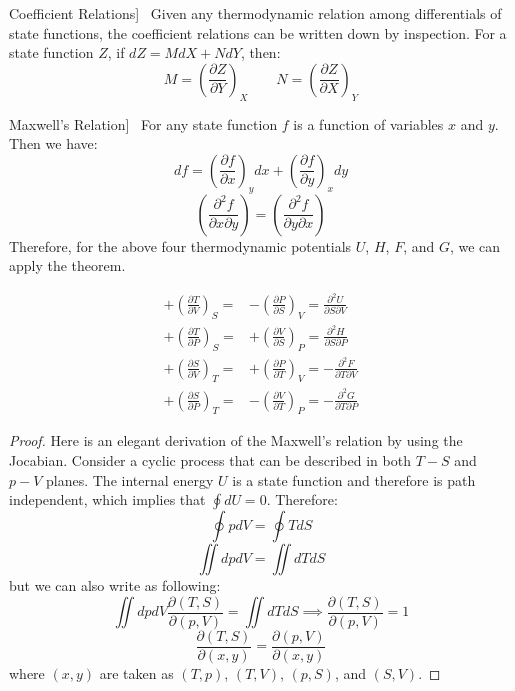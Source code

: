 \documentclass[UTF8]{book}
\newenvironment{theorem}[2][Theorem]{\begin{trivlist}
\item[\hskip \labelsep {\bfseries #1}\hskip \labelsep {\bfseries }]}{\end{trivlist}}
\begin{document}
\begin{theorem}
[Coefficient Relations]~  {Given any thermodynamic relation among differentials of state functions, the coefficient relations can be written down by inspection. For a state function $Z$, if $dZ=MdX+NdY$, then:}
$$M=\left( \frac{\partial Z}{\partial Y}\right)_{X}\qquad N=\left( \frac{\partial Z}{\partial X}\right)_{Y}$$
\end{theorem}
\begin{theorem}
[Maxwell's Relation]~  {For any state function $f$ is a function of variables $x$ and $y$. Then we have:}
$$df=\left(\dfrac{\partial f}{\partial x}\right)_ydx+\left(\dfrac{\partial f}{\partial y}\right)_xdy$$
$$\left(\dfrac{\partial ^2 f}{\partial x\partial y }\right)=\left(\dfrac{\partial ^2 f}{\partial y\partial x }\right)$$
 {Therefore, for the above four thermodynamic potentials $U$, $H$, $F$, and $G$, we can apply the theorem.}

\begin{align*}
+\left({\frac {\partial T}{\partial V}}\right)_{S}=&-\left({\frac {\partial P}{\partial S}}\right)_{V}={\frac {\partial ^{2}U}{\partial S\partial V}}\\
+\left({\frac {\partial T}{\partial P}}\right)_{S}=&+\left({\frac {\partial V}{\partial S}}\right)_{P}={\frac {\partial ^{2}H}{\partial S\partial P}}\\
+\left({\frac {\partial S}{\partial V}}\right)_{T}=&+\left({\frac {\partial P}{\partial T}}\right)_{V}=-{\frac {\partial ^{2}F}{\partial T\partial V}}\\
+\left({\frac {\partial S}{\partial P}}\right)_{T}=&-\left({\frac {\partial V}{\partial T}}\right)_{P}=-{\frac {\partial ^{2}G}{\partial T\partial P}}
\end{align*}
\end{theorem}
\begin{proof}
 {Here is an elegant derivation of the Maxwell's relation by using the Jocabian. Consider a cyclic process that can be described in both $T-S$ and $p-V$ planes. The internal energy $U$ is a state function and therefore is path independent, which implies that $\oint dU=0$. Therefore:}
$$\oint pdV=\oint TdS$$
$$\iint dpdV=\iint dTdS$$
 {but we can also write as following:}
$$\iint dpdV\dfrac{\partial (T,S)}{\partial (p,V)}=\iint dTdS \implies \dfrac{\partial (T,S)}{\partial (p,V)}=1$$
$$\dfrac{\partial (T,S)}{\partial (x,y)}=\dfrac{\partial (p,V)}{\partial (x,y)}$$
 {where $(x,y)$ are taken as $(T,p)$, $(T,V)$, $(p,S)$, and $(S,V)$.}
\end{proof}
\end{document}
